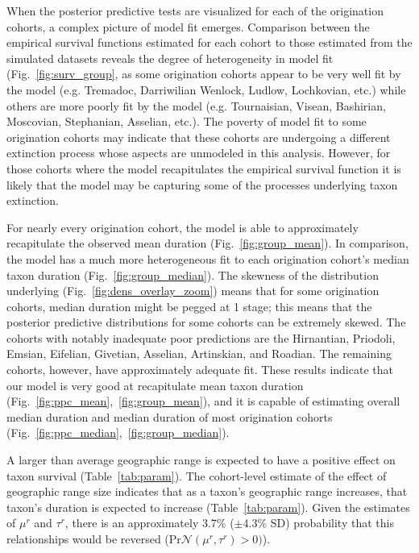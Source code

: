\documentclass[11pt]{article}
\begin{document}
When the posterior predictive tests are visualized for each of the origination cohorts, a complex picture of model fit emerges. Comparison between the empirical survival functions estimated for each cohort to those estimated from the simulated datasets reveals the degree of heterogeneity in model fit (Fig.~\ref{fig:surv_group}, as some origination cohorts appear to be very well fit by the model (e.g. Tremadoc, Darriwilian Wenlock, Ludlow, Lochkovian, etc.) while others are more poorly fit by the model (e.g. Tournaisian, Visean, Bashirian, Moscovian, Stephanian, Asselian, etc.). The poverty of model fit to some origination cohorts may indicate that these cohorts are undergoing a different extinction process whose aspects are unmodeled in this analysis. However, for those cohorts where the model recapitulates the empirical survival function it is likely that the model may be capturing some of the processes underlying taxon extinction.

For nearly every origination cohort, the model is able to approximately recapitulate the observed mean duration (Fig.~\ref{fig:group_mean}). In comparison, the model has a much more heterogeneous fit to each origination cohort's median taxon duration (Fig.~\ref{fig:group_median}). The skewness of the distribution underlying (Fig.~\ref{fig:dens_overlay_zoom}) means that for some origination cohorts, median duration might be pegged at 1 stage; this means that the posterior predictive distributions for some cohorts can be extremely skewed. The cohorts with notably inadequate poor predictions are the Hirnantian, Priodoli, Emsian, Eifelian, Givetian, Asselian, Artinskian, and Roadian. The remaining cohorts, however, have approximately adequate fit. These results indicate that our model is very good at recapitulate mean taxon duration (Fig.~\ref{fig:ppc_mean},~\ref{fig:group_mean}), and it is capable of estimating overall median duration and median duration of most origination cohorts (Fig.~\ref{fig:ppc_median},~\ref{fig:group_median}).

A larger than average geographic range is expected to have a positive effect on taxon survival (Table~\ref{tab:param}). The cohort-level estimate of the effect of geographic range size indicates that as a taxon's geographic range increases, that taxon's duration is expected to increase (Table~\ref{tab:param}). Given the estimates of \(\mu^{r}\) and \(\tau^{r}\), there is an approximately 3.7\% (\(\pm 4.3\%\) SD) probability that this relationships would be reversed (\(\mathrm{Pr}\mathcal{N}(\mu^{r}, \tau^{r}) > 0)\)). 
\end{document}
